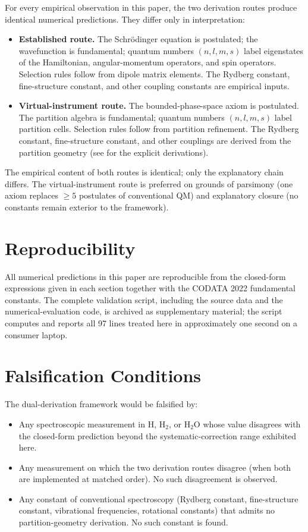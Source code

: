 \documentclass[twocolumn,11pt,a4paper]{article}
\theoremstyle{stmtstyle}
\theoremstyle{definition}
\theoremstyle{remark}
\begin{document}
For every empirical observation in this paper, the two derivation routes produce identical numerical predictions. They differ only in interpretation:

\begin{itemize}[nosep]
\item \textbf{Established route.} The Schr\"odinger equation is postulated; the wavefunction is fundamental; quantum numbers $(n,l,m,s)$ label eigenstates of the Hamiltonian, angular-momentum operators, and spin operators. Selection rules follow from dipole matrix elements. The Rydberg constant, fine-structure constant, and other coupling constants are empirical inputs.
\item \textbf{Virtual-instrument route.} The bounded-phase-space axiom is postulated. The partition algebra is fundamental; quantum numbers $(n,l,m,s)$ label partition cells. Selection rules follow from partition refinement. The Rydberg constant, fine-structure constant, and other couplings are derived from the partition geometry (see \citet{sachikonye2026bps} for the explicit derivations).
\end{itemize}

The empirical content of both routes is identical; only the explanatory chain differs. The virtual-instrument route is preferred on grounds of parsimony (one axiom replaces $\geq 5$ postulates of conventional QM) and explanatory closure (no constants remain exterior to the framework).

\section{Reproducibility}
\label{sec:reproducibility}

All numerical predictions in this paper are reproducible from the closed-form expressions given in each section together with the CODATA 2022 fundamental constants. The complete validation script, including the source data and the numerical-evaluation code, is archived as supplementary material; the script computes and reports all 97 lines treated here in approximately one second on a consumer laptop.

\section{Falsification Conditions}
\label{sec:falsification}

The dual-derivation framework would be falsified by:
\begin{itemize}[nosep]
\item Any spectroscopic measurement in H, H$_{2}$, or H$_{2}$O whose value disagrees with the closed-form prediction beyond the systematic-correction range exhibited here.
\item Any measurement on which the two derivation routes disagree (when both are implemented at matched order). No such disagreement is observed.
\item Any constant of conventional spectroscopy (Rydberg constant, fine-structure constant, vibrational frequencies, rotational constants) that admits no partition-geometry derivation. No such constant is found.
\end{itemize}
\end{document}

